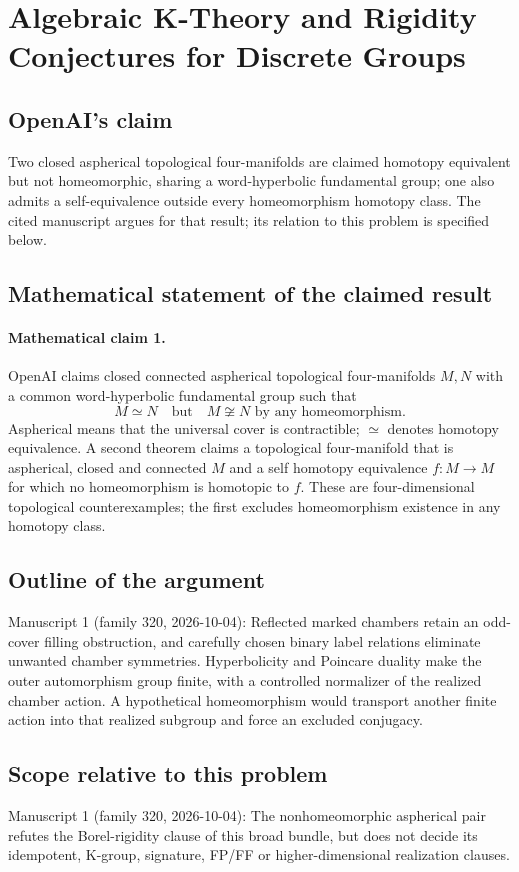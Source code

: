 \documentclass[11pt]{article}
\begin{document}
\section*{Algebraic K-Theory and Rigidity Conjectures for Discrete Groups}

\subsection{OpenAI's claim}
Two closed aspherical topological four-manifolds are claimed homotopy equivalent but not homeomorphic, sharing a word-hyperbolic fundamental group; one also admits a self-equivalence outside every homeomorphism homotopy class. The cited manuscript argues for that result; its relation to this problem is specified below.

\subsection{Mathematical statement of the claimed result}
\paragraph{Mathematical claim 1.} OpenAI claims closed connected aspherical topological four-manifolds $M,N$ with a common word-hyperbolic fundamental group such that
\[
M\simeq N\quad\text{but}\quad M\not\cong N\text{ by any homeomorphism}.
\]
Aspherical means that the universal cover is contractible; $\simeq$ denotes homotopy equivalence. A second theorem claims a topological four-manifold that is aspherical, closed and connected $M$ and a self homotopy equivalence $f:M\to M$ for which no homeomorphism is homotopic to $f$. These are four-dimensional topological counterexamples; the first excludes homeomorphism existence in any homotopy class.

\subsection{Outline of the argument}
Manuscript 1 (family 320, 2026-10-04): Reflected marked chambers retain an odd-cover filling obstruction, and carefully chosen binary label relations eliminate unwanted chamber symmetries. Hyperbolicity and Poincare duality make the outer automorphism group finite, with a controlled normalizer of the realized chamber action. A hypothetical homeomorphism would transport another finite action into that realized subgroup and force an excluded conjugacy.

\subsection{Scope relative to this problem}
Manuscript 1 (family 320, 2026-10-04): The nonhomeomorphic aspherical pair refutes the Borel-rigidity clause of this broad bundle, but does not decide its idempotent, K-group, signature, FP/FF or higher-dimensional realization clauses.
\end{document}

